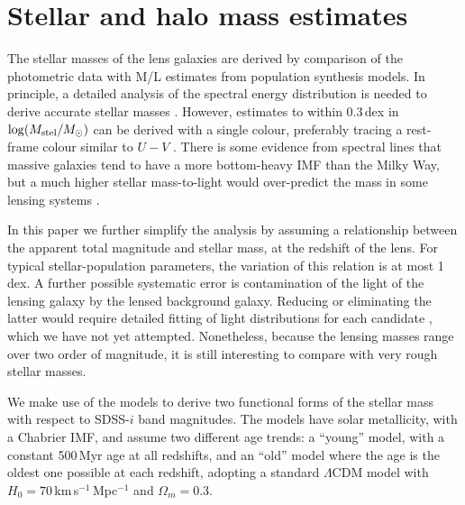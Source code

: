 
\section{Stellar and halo mass estimates}
\label{sec:stellar-mass}

The stellar masses of the lens galaxies are derived by comparison of
the photometric data with M/L estimates from population synthesis
models.  In principle, a detailed analysis of the spectral energy
distribution is needed to derive accurate stellar masses
\citep[e.g.][]{2009ApJS..185..253G,2011MNRAS.418.1587T}.  However,
estimates to within 0.3\,dex in $\log(M_\text{stel}/M_\odot)$ can be derived
with a single colour, preferably tracing a rest-frame colour similar
to $U-V$ \citep[see Fig.~1 of][]{2008MNRAS.383..857F}.  There is some
evidence from spectral lines that massive galaxies tend to have a more
bottom-heavy IMF than the Milky Way, but a much higher stellar
mass-to-light would over-predict the mass in some lensing systems
\citep{2015MNRAS.454L..71S}.

In this paper we further simplify the analysis by assuming a
relationship between the apparent total magnitude and stellar mass, at
the redshift of the lens.  For typical stellar-population parameters,
the variation of this relation is at most 1\,dex.  A further possible
systematic error is contamination of the light of the lensing galaxy
by the lensed background galaxy.  Reducing or eliminating the latter
would require detailed fitting of light distributions for each
candidate \citep[see][]{2011ApJ...740...97L}, which we have not yet
attempted.  Nonetheless, because the lensing masses range over two
order of magnitude, it is still interesting to compare with very rough
stellar masses.

We make use of the \citet{2003MNRAS.344.1000B} models to derive two
functional forms of the stellar mass with respect to SDSS-$i$ band
magnitudes. The models have solar metallicity, with a Chabrier IMF,
and assume two different age trends: a ``young'' model, with a
constant 500\,Myr age at all redshifts, and an ``old'' model where the
age is the oldest one possible at each redshift, adopting a standard
$\Lambda$CDM model with $H_0=70$\,km\,s$^{-1}$\,Mpc$^{-1}$ and
$\Omega_m=0.3$.

